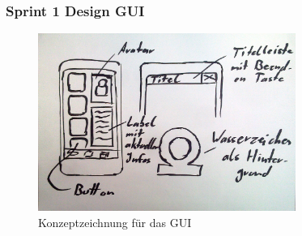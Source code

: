 \begin{frame}
	\frametitle{Sprint 1 Design GUI}

	\begin{figure}
		\centering
		\includegraphics[width = 0.75\textwidth]{gui-design}
		\caption{Konzeptzeichnung für das GUI}
	\end{figure}
\end{frame}

